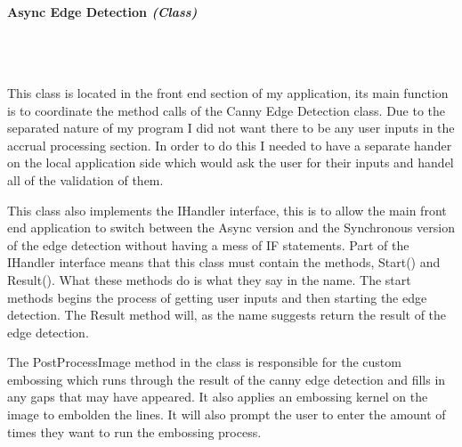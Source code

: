 \begin{FlushLeft}
\begin{enumerate}
    \paragraph{Async Edge Detection \textit{(Class)}} \mbox{} \\

    \begin{figure}[H]
        \centering
    \end{figure}\\

    This class is located in the front end section of my application, its main function is to coordinate the method calls of the Canny Edge Detection class. Due to the separated nature of my program I did not want there to be any user inputs in the accrual processing section. In order to do this I needed to have a separate hander on the local application side which would ask the user for their inputs and handel all of the validation of them. \\ \bk

    This class also implements the IHandler interface, this is to allow the main front end application to switch between the Async version and the Synchronous version of the edge detection without having a mess of IF statements. Part of the IHandler interface means that this class must contain the methods, Start() and Result(). What these methods do is what they say in the name. The start methods begins the process of getting user inputs and then starting the edge detection. The Result method will, as the name suggests return the result of the edge detection. \\ \bk

    The PostProcessImage method in the class is responsible for the custom embossing which runs through the result of the canny edge detection and fills in any gaps that may have appeared. It also applies an embossing kernel on the image to embolden the lines. It will also prompt the user to enter the amount of times they want to run the embossing process. \\ \bk
    

\end{enumerate}
\end{FlushLeft}
